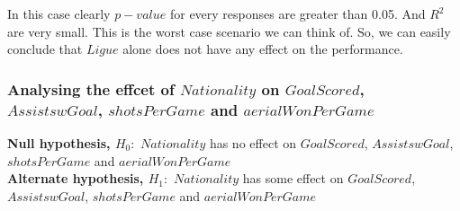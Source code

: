 \documentclass[12pt]{article}
\begin{document}
In this case clearly $ p-value $ for every responses are greater than 0.05. And $ R^2 $ are very small. This is the worst case scenario we can think of. So, we can easily conclude that $ Ligue $ alone does not have any effect on the performance.	

\newpage
	
\subsubsection{Analysing the effcet of $ Nationality $ on $ GoalScored $, \\ $ AssistswGoal $, $ shotsPerGame $ and $ aerialWonPerGame $}

\textbf{Null hypothesis, $ H_0: $} $ Nationality $ has no effect on $ GoalScored $, $ AssistswGoal $, $ shotsPerGame $ and $ aerialWonPerGame $\\
\textbf{Alternate hypothesis, $ H_1: $} $ Nationality $ has some effect on $ GoalScored $, $ AssistswGoal $, $ shotsPerGame $ and $ aerialWonPerGame $
		
\end{document}

